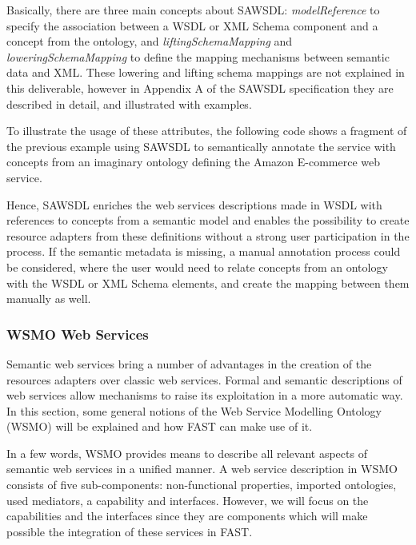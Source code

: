 \documentclass{fast_latex}
\begin{document}
Basically, there are three main concepts about SAWSDL: \emph{modelReference} to specify the association between a WSDL or XML Schema component and a concept from the ontology, and \emph{liftingSchemaMapping} and \emph{loweringSchemaMapping} to define the mapping mechanisms between semantic data and XML. These lowering and lifting schema mappings are not explained in this deliverable, however in Appendix A of the SAWSDL specification \cite{sawsdl} they are described in detail, and illustrated with examples.

To illustrate the usage of these attributes, the following code shows a fragment of the previous example using SAWSDL to semantically annotate the service with concepts from an imaginary ontology defining the Amazon E-commerce web service.

\singlespacing
\begin{small}

\end{small}
\doublespacing

Hence, SAWSDL enriches the web services descriptions made in WSDL with references to concepts from a semantic model and enables the possibility to create resource adapters from these definitions without a strong user participation in the process. If the semantic metadata is missing, a manual annotation process could be considered, where the user would need to relate concepts from an ontology with the WSDL or XML Schema elements, and create the mapping between them manually as well.


\subsubsection{WSMO Web Services} %
\label{ssub:wsmo_web_services}

Semantic web services bring a number of advantages in the creation of the resources adapters over classic web services. Formal and semantic descriptions of web services allow mechanisms to raise its exploitation in a more automatic way. In this section, some general notions of the Web Service Modelling Ontology (WSMO) will be explained and how FAST can make use of it.

In a few words, WSMO provides means to describe all relevant aspects of semantic web services in a unified manner. A web service description in WSMO consists of five sub-components: non-functional properties, imported ontologies, used mediators, a capability and interfaces. However, we will focus on the capabilities and the interfaces since they are components which will make possible the integration of these services in FAST.
\end{document}
